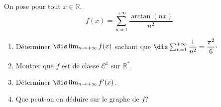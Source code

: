 \documentclass[a4paper,10pt]{report}
\begin{document}
\medskip



\begin{Exercice}{} On pose pour tout $x \in \mathbb{R}$,
$$ f(x) = \sum_{n=1}^{+ \infty} \dfrac{\arctan(nx)}{n^2}$$
\begin{enumerate}
\item Déterminer $\dis \lim_{n \rightarrow + \infty} f(x)$ sachant que $\dis \sum_{n=1}^{+ \infty} \dfrac{1}{n^2} = \dfrac{\pi^2}{6} \cdot$
\item Montrer que $f$ est de classe $\mathcal{C}^1$ sur $\mathbb{R}^*$.
\item Déterminer $\dis \lim_{n \rightarrow + \infty} f'(x)$.
\item Que peut-on en déduire sur le graphe de $f$?
\end{enumerate}
\end{Exercice}
\end{document}
